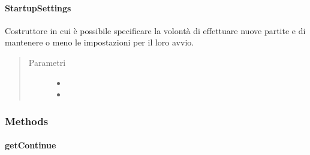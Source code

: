 \documentclass[letterpaper,10pt,italian,openany,oneside]{sphinxmanual}
\begin{document}
\paragraph{StartupSettings}
\label{\detokenize{test/it/unicam/cs/pa/mastermind/gamecore/StartupSettings:id2}}

\begin{fulllineitems}
\label{\detokenize{test/it/unicam/cs/pa/mastermind/gamecore/StartupSettings:it.unicam.cs.pa.mastermind.gamecore.StartupSettings.StartupSettings(boolean, boolean)}}
Costruttore in cui è possibile specificare la volontà di effettuare nuove partite e di mantenere o meno le impostazioni per il loro avvio.
\begin{quote}\begin{description}
\item[{Parametri}] \leavevmode\begin{itemize}
\item {} 
 \textendash{} 

\item {} 
 \textendash{} 

\end{itemize}

\end{description}\end{quote}

\end{fulllineitems}



\subsubsection{Methods}
\label{\detokenize{test/it/unicam/cs/pa/mastermind/gamecore/StartupSettings:methods}}

\paragraph{getContinue}
\label{\detokenize{test/it/unicam/cs/pa/mastermind/gamecore/StartupSettings:getcontinue}}
\end{document}
